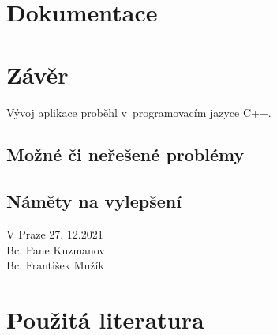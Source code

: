 \documentclass[a4paper, 12pt, oneside, titlepage]{article} %
\begin{document}
\section{Dokumentace}


\section{Závěr}
 Vývoj aplikace proběhl v~programovacím jazyce C++. 

\subsection{Možné či neřešené problémy} \label{mcn_problemy}

\subsection{Náměty na vylepšení} \label{vylepseni}





\begin{flushright}
V Praze 27. 12.2021\\
\vspace{2mm}
Bc. Pane Kuzmanov\\
Bc. František Mužík\\
\end{flushright}


\clearpage 
\section*{Použitá literatura}
\renewcommand{\section}[2]{}%


\end{document}
